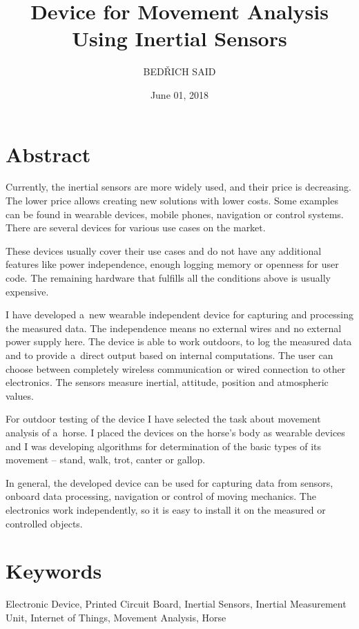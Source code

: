 \documentclass[12pt, a4paper]{article}
\begin{document}
	
	\title{Device for Movement Analysis\\Using Inertial Sensors}
	\author{\MakeUppercase{Bed{\v{r}}ich Said}}
	\date{June 01, 2018}
	
	\maketitle
	
	\section*{Abstract}
	Currently, the inertial sensors are more widely used, and their price is decreasing. The lower price allows creating new solutions with lower costs. Some examples can be found in wearable devices, mobile phones, navigation or control systems. There are several devices for various use cases on the market.
	
	These devices usually cover their use cases and do not have any additional features like power independence, enough logging memory or openness for user code. The remaining hardware that fulfills all the conditions above is usually expensive.
	
	I have developed a~new wearable independent device for capturing and processing the measured data. The independence means no external wires and no external power supply here. The device is able to work outdoors, to log the measured data and to provide a~direct output based on internal computations. The user can choose between completely wireless communication or wired connection to other electronics. The sensors measure inertial, attitude, position and atmospheric values.
	
	For outdoor testing of the device I have selected the task about movement analysis of a~horse. I placed the devices on the horse's body as wearable devices and I was developing algorithms for determination of the basic types of its movement -- stand, walk, trot, canter or gallop.
	
	In general, the developed device can be used for capturing data from sensors, onboard data processing, navigation or control of moving mechanics. The electronics work independently, so it is easy to install it on the measured or controlled objects.
	
	\section*{Keywords}
	Electronic Device, Printed Circuit Board, Inertial Sensors, Inertial Measurement Unit, Internet of Things, Movement Analysis, Horse
	
\end{document}
